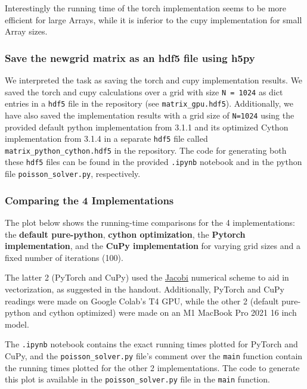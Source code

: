 \documentclass[a4paper,12pt]{article}
\begin{document}
 Interestingly the running time of the torch implementation seems to be more efficient for large Arrays, while it is
 inferior to the cupy implementation for small Array sizes.

\subsubsection{Save the newgrid matrix as an hdf5 file using h5py }
We interpreted the task as saving the torch and cupy implementation results. We saved the torch and cupy calculations over a grid with size \verb|N = 1024|
as dict entries in a \verb|hdf5| file in the repository (see \verb|matrix_gpu.hdf5|). Additionally, we have also saved the implementation results with a grid size of \verb|N=1024| using the provided default python implementation from 3.1.1 and its optimized Cython implementation from 3.1.4 in a separate \verb|hdf5| file called \verb|matrix_python_cython.hdf5| in the repository. The code for generating both these \verb|hdf5| files can be found in the provided \verb|.ipynb| notebook and in the python file \verb|poisson_solver.py|, respectively.

\subsubsection{Comparing the 4 Implementations}
The plot below shows the running-time comparisons for the 4 implementations: the \textbf{default pure-python}, \textbf{cython optimization}, the \textbf{Pytorch implementation}, and the \textbf{CuPy implementation} for varying grid sizes and a fixed number of iterations (100). 

The latter 2 (PyTorch and CuPy) used the \underline{Jacobi} numerical scheme to aid in vectorization, as suggested in the handout. Additionally, PyTorch and CuPy readings were made on Google Colab's T4 GPU, while the other 2 (default pure-python and cython optimized) were made on an M1 MacBook Pro 2021 16 inch model. 

The \verb|.ipynb| notebook contains the exact running times plotted for PyTorch and CuPy, and the \verb|poisson_solver.py| file's comment over the \verb|main| function contain the running times plotted for the other 2 implementations. The code to generate this plot is available in the \verb|poisson_solver.py| file in the \verb|main| function.
\end{document}
